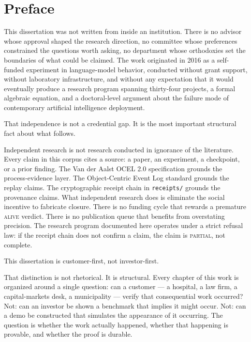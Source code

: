 \chapter*{Preface}
\label{chap:preface}

This dissertation was not written from inside an institution. There is no advisor whose approval shaped the research direction, no committee whose preferences constrained the questions worth asking, no department whose orthodoxies set the boundaries of what could be claimed. The work originated in 2016 as a self-funded experiment in language-model behavior, conducted without grant support, without laboratory infrastructure, and without any expectation that it would eventually produce a research program spanning thirty-four projects, a formal algebraic equation, and a doctoral-level argument about the failure mode of contemporary artificial intelligence deployment.

That independence is not a credential gap. It is the most important structural fact about what follows.

Independent research is not research conducted in ignorance of the literature. Every claim in this corpus cites a source: a paper, an experiment, a checkpoint, or a prior finding. The Van der Aalst OCEL 2.0 specification grounds the process-evidence layer. The Object-Centric Event Log standard grounds the replay claims. The cryptographic receipt chain in \texttt{receipts/} grounds the provenance claims. What independent research does is eliminate the social incentive to fabricate closure. There is no funding cycle that rewards a premature \textsc{alive} verdict. There is no publication queue that benefits from overstating precision. The research program documented here operates under a strict refusal law: if the receipt chain does not confirm a claim, the claim is \textsc{partial}, not complete.

\medskip

This dissertation is customer-first, not investor-first.

That distinction is not rhetorical. It is structural. Every chapter of this work is organized around a single question: can a customer --- a hospital, a law firm, a capital-markets desk, a municipality --- verify that consequential work occurred? Not: can an investor be shown a benchmark that implies it might occur. Not: can a demo be constructed that simulates the appearance of it occurring. The question is whether the work actually happened, whether that happening is provable, and whether the proof is durable.

